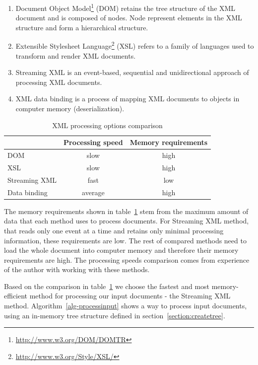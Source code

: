 \documentclass[11pt,oneside,final]{fithesis2}
\begin{document}
\begin{enumerate}
\item Document Object Model\footnote{\url{http://www.w3.org/DOM/DOMTR}} (DOM) retains the tree structure of the XML document and is composed of nodes. Node represent elements in the XML structure and form a hierarchical structure.

\item Extensible Stylesheet Language\footnote{\url{http://www.w3.org/Style/XSL/}} (XSL) refers to a family of languages used to transform and render XML documents. 

\item Streaming XML is an event-based, sequential and unidirectional approach of processing XML documents.

\item XML data binding is a process of mapping XML documents to objects in computer memory (deserialization).
\end{enumerate}

\begin{table}[!ht]
\centering
\begin{tabular}{|l|c|c|}
\hline
& Processing speed & Memory requirements \\ \hline
\hline
DOM & slow & high  \\ \hline
XSL & slow & high  \\ \hline
Streaming XML & fast & low  \\ \hline
Data binding & average & high  \\ \hline
\end{tabular}
\caption{XML processing options comparison}
\label{table:xmlprocessing}
\end{table}

The memory requirements shown in table~\ref{table:xmlprocessing} stem from the maximum amount of data that each method uses to process documents. For Streaming XML method, that reads only one event at a time and retains only minimal processing information, these requirements are low. The rest of compared methods need to load the whole document into computer memory and therefore their memory requirements are high. The processing speeds comparison comes from experience of the author with working with these methods.

Based on the comparison in table~\ref{table:xmlprocessing} we choose the fastest and most memory-efficient method for processing our input documents - the Streaming XML method. Algorithm~\ref{alg-processinput} shows a way to process input documents, using an in-memory tree structure defined in section~\ref{section:createtree}.
\end{document}
